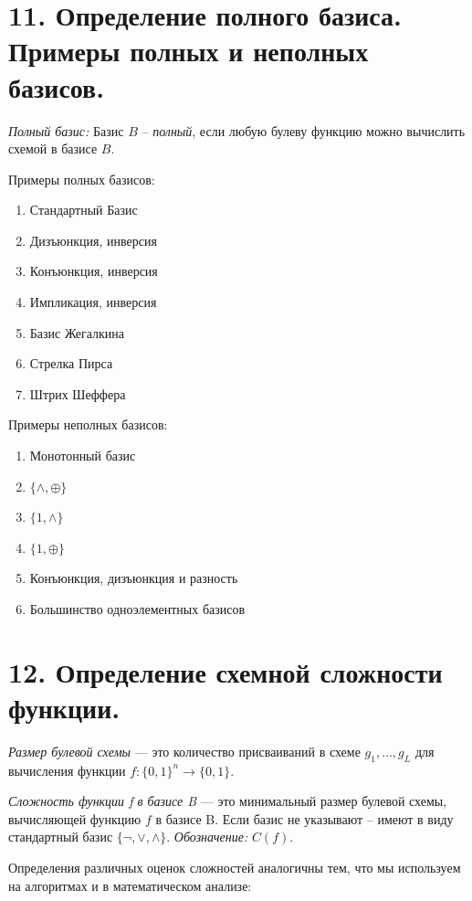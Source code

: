 \documentclass[a4paper, 12pt]{article}
\begin{document}
\section*{11. Определение полного базиса. Примеры полных и неполных базисов.}

\textit{Полный базис: } Базис $B$ -- \textit{полный}, если любую булеву функцию можно вычислить схемой в базисе $B$.
 
Примеры полных базисов:

\begin{enumerate}
    \item Стандартный Базис
    \item Дизъюнкция, инверсия
    \item Конъюнкция, инверсия
    \item Импликация, инверсия
    \item Базис Жегалкина
    \item Стрелка Пирса
    \item Штрих Шеффера
\end{enumerate}

Примеры неполных базисов:

\begin{enumerate}
    \item Монотонный базис
    \item $\{\wedge,\oplus\}$
    \item $\{1,\wedge\}$
    \item $\{1,\oplus\}$
    \item Конъюнкция, дизъюнкция и разность
    \item Большинство одноэлементных базисов
\end{enumerate}

\section*{12. Определение схемной сложности функции.}

\textit{Размер булевой схемы} --- это количество присваиваний в схеме 
$g_1, \ldots, g_L$ для вычисления функции $f: \{0, 1\}^n \rightarrow \{0, 1\}$. 

\textit{Сложность функции f в базисе B} --- это минимальный размер булевой схемы, 
вычисляющей функцию $f$ в базисе B. Если базис не указывают -- имеют в виду 
стандартный базис $\{\lnot, \lor, \land\}$. \textit{Обозначение:} $C(f)$.

Определения различных оценок сложностей аналогичны тем, что мы используем на алгоритмах и в математическом анализе:
\end{document}
